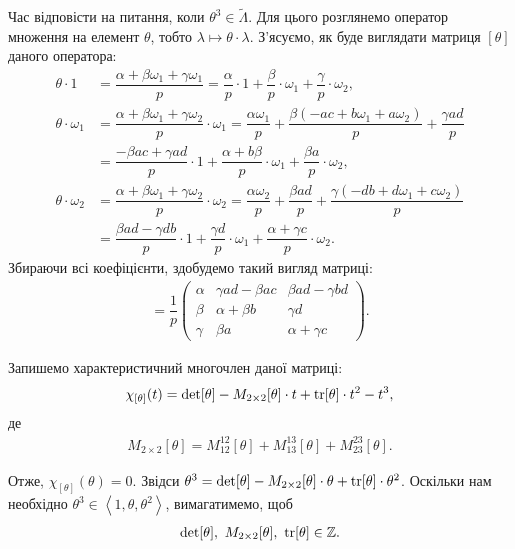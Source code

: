 \documentclass{thesis}
\begin{document}
Час відповісти на питання, коли $\theta^3 \in \tilde{\Lambda}$. Для цього розглянемо оператор множення на елемент $\theta$, тобто $\lambda \mapsto \theta \cdot \lambda$. З'ясуємо, як буде виглядати матриця $[\theta]$ даного оператора:
\begin{align*}
\theta \cdot 1 & = \dfrac{\alpha+\beta \omega_1 + \gamma \omega_1}{p} = \dfrac{\alpha}{p} \cdot 1 + \dfrac{\beta}{p} \cdot \omega_1 + \dfrac{\gamma}{p} \cdot \omega_2, \\
\theta \cdot \omega_1 & = \dfrac{\alpha + \beta \omega_1 + \gamma \omega_2}{p} \cdot \omega_1 = \dfrac{\alpha \omega_1}{p} + \dfrac{\beta (-ac+b\omega_1 + a\omega_2)}{p} + \dfrac{\gamma ad}{p} \\
& = \dfrac{-\beta a c + \gamma ad}{p} \cdot 1 + \dfrac{\alpha + b\beta}{p}\cdot \omega_1 + \dfrac{\beta a}{p} \cdot \omega_2, \\
\theta \cdot \omega_2 & = \dfrac{\alpha+\beta \omega_1 + \gamma \omega_2}{p} \cdot \omega_2 = \dfrac{\alpha \omega_2}{p} + \dfrac{\beta ad}{p} + \dfrac{\gamma (-db + d \omega_1 + c \omega_2)}{p} \\
& = \dfrac{\beta a d - \gamma d b}{p}\cdot 1 + \dfrac{\gamma d}{p} \cdot \omega_1 + \dfrac{\alpha + \gamma c}{p} \cdot \omega_2.
\end{align*}
Збираючи всі коефіцієнти, здобудемо такий вигляд матриці:
\begin{align*}
[\theta] = \dfrac{1}{p} \begin{pmatrix}
\alpha & \gamma a d -\beta a c & \beta a d - \gamma b d \\
\beta & \alpha + \beta b & \gamma d \\
\gamma & \beta a & \alpha + \gamma c
\end{pmatrix}.
\end{align*}

Запишемо характеристичний многочлен даної матриці:
\begin{align*}
\chi_{[\theta]}(t) = \det [\theta] - M_{2 \times 2}[\theta] \cdot t + \operatorname{tr} [\theta] \cdot t^2 - t^3,
\end{align*}
де
\begin{align*}
M_{2 \times 2}[\theta] = M_{12}^{12}[\theta] + M_{13}^{13}[\theta] + M_{23}^{23}[\theta].
\end{align*}

Отже, $\chi_{[\theta]}(\theta) = 0$. Звідси $\theta^3 = \det [\theta] - M_{2 \times 2}[\theta] \cdot \theta + \operatorname{tr} [\theta] \cdot \theta^2$. Оскільки нам необхідно $\theta^3 \in \left<1,\theta,\theta^2\right>$, вимагатимемо, щоб
\begin{align*}
\det [\theta],\ M_{2 \times 2}[\theta],\ \operatorname{tr} [\theta] \in \mathbb{Z}.
\end{align*}
\end{document}
